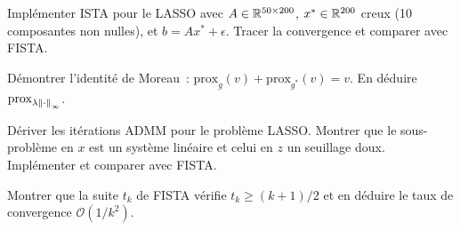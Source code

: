 \begin{exercice}
Impl\'ementer ISTA pour le LASSO avec $A \in \mathbb{R}^{50 \times 200}$,
$x^* \in \mathbb{R}^{200}$ creux (10 composantes non nulles), et $b = Ax^* + \epsilon$.
Tracer la convergence et comparer avec FISTA.
\end{exercice}

\begin{exercice}
D\'emontrer l'identit\'e de Moreau~: $\mathrm{prox}_g(v) + \mathrm{prox}_{g^*}(v) = v$.
En d\'eduire $\mathrm{prox}_{\lambda \left\| \cdot \right\|_\infty}$.
\end{exercice}

\begin{exercice}
D\'eriver les it\'erations ADMM pour le probl\`eme LASSO. Montrer que le
sous-probl\`eme en $x$ est un syst\`eme lin\'eaire et celui en $z$ un
seuillage doux. Impl\'ementer et comparer avec FISTA.
\end{exercice}

\begin{exercice}
Montrer que la suite $t_k$ de FISTA v\'erifie $t_k \geq (k+1)/2$ et en
d\'eduire le taux de convergence $\mathcal{O}(1/k^2)$.
\end{exercice}
